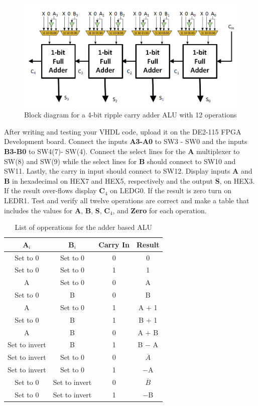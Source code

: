 \begin{figure}[H]
	\centering
	\includegraphics[width=150mm]{Lab3/figures/fulladderalu.png}
	\caption{Block diagram for a 4-bit ripple carry adder ALU with 12 operations}
	\label{fig:fulladderalu}
\end{figure}

After writing and testing your VHDL code, upload it on the DE2-115 FPGA Development board. Connect the inputs {\bf A3-A0} to SW3 - SW0 and the inputs {\bf B3-B0} to SW4(7)- SW(4). Connect the select lines for the {\bf A} multiplexer to SW(8) and SW(9) while the select lines for {\bf B} should connect to SW10 and SW11. Lastly, the carry in input should connect to SW12. Display inputs {\bf A} and {\bf B} in hexadecimal on HEX7 and HEX5, respectively and the output {\bf S}, on HEX3. If the result over-flows display {\bf C$_4$} on LEDG0. If the result is zero turn on LEDR1. Test and verify all twelve operations are correct and make a table that includes the values for {\bf A}, {\bf B}, {\bf S}, {\bf C$_4$}, and {\bf Zero} for each operation.

\begin{table}[H]
	\centering
	\caption{List of opperations for the adder based ALU}
	\begin{tabular}{ | c | c | c | c | }
		\hline                        
 		\bf A$_i$ & \bf B$_i$ & \bf Carry In & \bf Result \\ \hline
 		Set to 0 & Set to 0 & 0 & 0 \\ \hline
 		Set to 0 &  Set to 0 & 1 & 1 \\ \hline
 		A &  Set to 0 & 0 & A \\ \hline
 		Set to 0 & B  & 0  & B  \\ \hline
 		A & Set to 0 & 1 & A $+$ 1 \\ \hline
 		Set to 0 & B & 1 & B $+$ 1 \\ \hline
 		A & B & 0 & A $+$ B \\ \hline
 		Set to invert & B & 1 & B $-$ A \\ \hline
 		Set to invert & Set to 0 & 0 & $\overline{A}$ \\ \hline
 		Set to invert & Set to 0 & 1 & $-$A \\  \hline
		Set to 0 & Set to invert & 0 & $\overline{B}$ \\ \hline
 		Set to 0 & Set to invert & 1 & $-$B \\ 
 		\hline
	\end{tabular}
	\label{tab:adderaluop}
\end{table}

